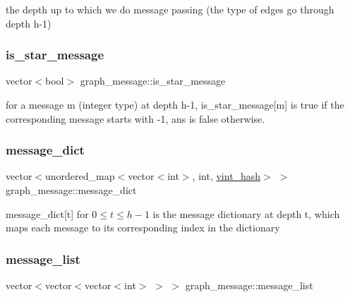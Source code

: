 the depth up to which we do message passing (the type of edges go through depth h-\/1) 

\mbox{\label{classgraph__message_a55ff5531a0043106369e84a7bc45e22d}} 
\subsubsection{\texorpdfstring{is\+\_\+star\+\_\+message}{is\_star\_message}}
{\footnotesize\ttfamily vector$<$bool$>$ graph\+\_\+message\+::is\+\_\+star\+\_\+message}



for a message m (integer type) at depth h-\/1, is\+\_\+star\+\_\+message\mbox{[}m\mbox{]} is true if the corresponding message starts with -\/1, ans is false otherwise. 

\mbox{\label{classgraph__message_ab54d89b122c2b1322da0d5db2043fb84}} 
\subsubsection{\texorpdfstring{message\+\_\+dict}{message\_dict}}
{\footnotesize\ttfamily vector$<$unordered\+\_\+map$<$vector$<$int$>$, int, \hyperlink{structvint__hash}{vint\+\_\+hash}$>$ $>$ graph\+\_\+message\+::message\+\_\+dict}



message\+\_\+dict\mbox{[}t\mbox{]} for $0 \leq t \leq h-1$ is the message dictionary at depth t, which maps each message to its corresponding index in the dictionary 

\mbox{\label{classgraph__message_aa17fdb629b423343edfafa97252763ef}} 
\subsubsection{\texorpdfstring{message\+\_\+list}{message\_list}}
{\footnotesize\ttfamily vector$<$vector$<$vector$<$int$>$ $>$ $>$ graph\+\_\+message\+::message\+\_\+list}



